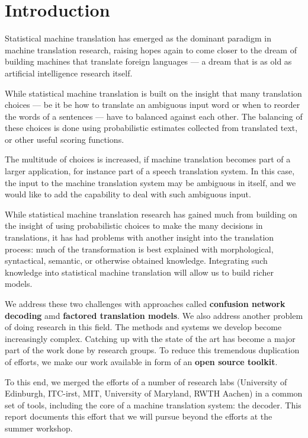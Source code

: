 \documentclass[11pt]{report}
\theoremstyle{plain}
\begin{document}
\tableofcontents

\chapter{Introduction}
Statistical machine translation has emerged as the dominant paradigm in machine translation research, raising hopes again to come closer to the dream of building machines that translate foreign languages --- a dream that is as old as artificial intelligence research itself.

While statistical machine translation is built on the insight that many translation choices --- be it be how to translate an ambiguous input word or when to reorder the words of a sentences --- have to balanced against each other. The balancing of these choices is done using probabilistic estimates collected from translated text, or other useful scoring functions.

The multitude of choices is increased, if machine translation becomes part of a larger application, for instance part of a speech translation system. In this case, the input to the machine translation system may be ambiguous in itself, and we would like to add the capability to deal with such ambiguous input. 

While statistical machine translation research has gained much from building on the insight of using probabilistic choices to make the many decisions in translations, it has had problems with another insight into the translation process: much of the transformation is best explained with morphological, syntactical, semantic, or otherwise obtained knowledge. Integrating such knowledge into statistical machine translation will allow us to build richer models.

We address these two challenges with approaches called {\bf confusion network decoding} amd {\bf factored translation models}. We also address another problem of doing research in this field. The methods and systems we develop become increasingly complex. Catching up with the state of the art has become a major part of the work done by research groups. To reduce this tremendous duplication of efforts, we make our work available in form of an {\bf open source toolkit}.

To this end, we merged the efforts of a number of research labs (University of Edinburgh, ITC-irst, MIT, University of Maryland, RWTH Aachen) in a common set of tools, including the core of a machine translation system: the decoder. This report documents this effort that we will pursue beyond the efforts at the summer workshop.
\end{document}
